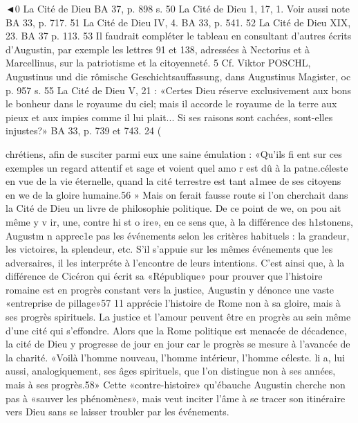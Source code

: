 ◄0 La Cité de Dieu BA 37, p. 898 s.
50 La Cité de Dieu 1, 17, 1. Voir aussi note BA 33, p. 717.
51 La Cité de Dieu IV, 4. BA 33, p. 541.
52 La Cité de Dieu XIX, 23. BA 37 p. 113.
53 Il faudrait compléter le tableau en consultant d'autres écrits d'Augustin, par exemple les lettres 91 et 138, adressées à Nectorius et à Marcellinus, sur la patriotisme et la citoyenneté.
5  Cf. Viktor POSCHL, Augustinus und die rômische Geschichtsauffassung, dans Augustinus Magister, oc p. 957 s.
55 La Cité de Dieu V, 21 : «Certes Dieu réserve exclusivement aux bons le bonheur dans le royaume du ciel; mais il accorde le royaume de la terre aux pieux et aux impies comme il lui plait... Si ses raisons sont cachées, sont-elles injustes?» BA 33, p. 739 et 743.
24	(
 
chrétiens, afin de susciter parmi eux une saine émulation : «Qu'ils fi ent sur ces exemples un regard attentif et sage et voient quel amo r est dû à la patne.céleste en vue de la vie éternelle, quand la cité terrestre est tant a1mee de ses citoyens en we de
la gloire humaine.56 »
Mais on ferait fausse route si l'on cherchait dans la Cité de Dieu un livre de philosophie politique. De ce point de we, on pou ait même y  v ir,  une, contre­ hi st o ire», en ce sens que, à la différence des h1stonens, Augustm n apprec1e pas les événements selon les critères habituels : la grandeur, les victoires, la splendeur, etc. S'il s'appuie sur les mêmes événements que les adversaires, il les interpréte à l'encontre de leurs intentions. C'est ainsi que, à la différence de Cicéron qui écrit sa
«République» pour prouver que l'histoire romaine est en progrès constant vers la justice, Augustin y dénonce une vaste «entreprise de pillage»57  11 apprécie l'histoire de Rome non à sa gloire, mais à ses progrès spirituels. La justice et l'amour peuvent être en progrès au sein même d'une cité qui s'effondre. Alors que la Rome politique est menacée de décadence, la cité de Dieu y progresse de jour en jour car le progrès se mesure à l'avancée de la charité. «Voilà l'homme nouveau, l'homme intérieur, l'homme céleste. li a, lui aussi, analogiquement, ses âges spirituels, que l'on distingue non à ses années, mais à ses progrès.58» Cette «contre-histoire» qu'ébauche Augustin cherche non pas à «sauver les phénomènes», mais veut inciter l'âme à se tracer son itinéraire vers Dieu sans se laisser troubler par les événements.

